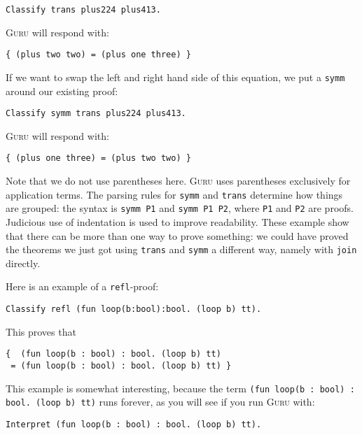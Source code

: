 \documentclass{book}[12pt]
\newcommand{\guru}[0]{\textsc{Guru}\xspace}
\begin{document}
\begin{verbatim}
Classify trans plus224 plus413.
\end{verbatim}

\noindent \guru will respond with:

\begin{verbatim}
{ (plus two two) = (plus one three) }
\end{verbatim}

\noindent If we want to swap the left and right hand side of this equation, we put a \texttt{symm}
around our existing proof:

\begin{verbatim}
Classify symm trans plus224 plus413.
\end{verbatim}

\noindent \guru will respond with:

\begin{verbatim}
{ (plus one three) = (plus two two) }
\end{verbatim}

\noindent Note that we do not use parentheses here.  \guru uses
parentheses exclusively for application terms.  The parsing rules for
\texttt{symm} and \texttt{trans} determine how things are grouped: the
syntax is \texttt{symm P1} and \texttt{symm P1 P2}, where \texttt{P1}
and \texttt{P2} are proofs.  Judicious use of indentation is used to
improve readability.  These example show that there can be more than
one way to prove something: we could have proved the theorems we just
got using \texttt{trans} and \texttt{symm} a different way, namely
with \texttt{join} directly.

Here is an example of a \texttt{refl}-proof:

\begin{verbatim}
Classify refl (fun loop(b:bool):bool. (loop b) tt).
\end{verbatim}

\noindent This proves that

\begin{verbatim}
{  (fun loop(b : bool) : bool. (loop b) tt)
 = (fun loop(b : bool) : bool. (loop b) tt) }
\end{verbatim}

\noindent This example is somewhat interesting, because the term
\texttt{(fun loop(b : bool) : bool. (loop b) tt)} runs forever, as you
will see if you run \guru with:

\begin{verbatim}
Interpret (fun loop(b : bool) : bool. (loop b) tt).
\end{verbatim}
\end{document}
